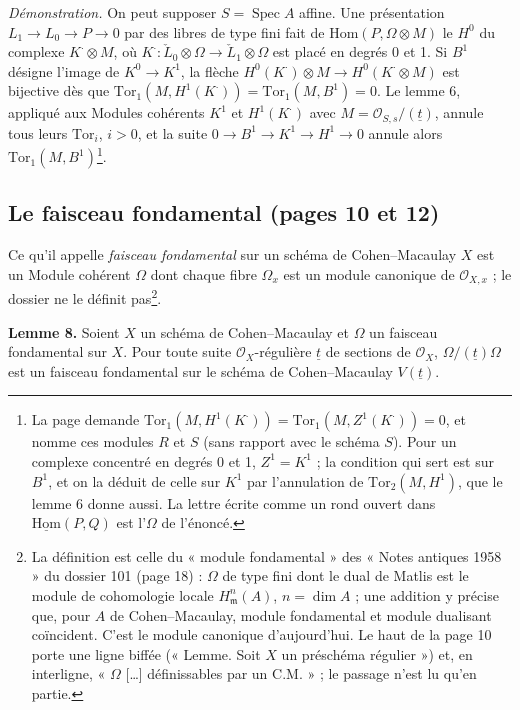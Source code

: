 \documentclass[11pt,a4paper]{article}
\begin{document}
\emph{Démonstration.} On peut supposer $S = \operatorname{Spec} A$ affine. Une
présentation $L_1 \to L_0 \to P \to 0$ par des libres de type fini fait de
$\mathrm{Hom}(P, \Omega \otimes M)$ le $H^0$ du complexe
$K^{\cdot} \otimes M$, où $K^{\cdot} \colon \check{L}_0 \otimes \Omega \to
\check{L}_1 \otimes \Omega$ est placé en degrés 0 et 1. Si $B^1$ désigne
l'image de $K^0 \to K^1$, la flèche $H^0(K^{\cdot}) \otimes M \to
H^0(K^{\cdot} \otimes M)$ est bijective dès que
$\mathrm{Tor}_1(M, H^1(K^{\cdot})) = \mathrm{Tor}_1(M, B^1) = 0$. Le lemme 6,
appliqué aux Modules cohérents $K^1$ et $H^1(K^{\cdot})$ avec
$M = \mathcal{O}_{S,s}/(\underline{t})$, annule tous leurs $\mathrm{Tor}_i$,
$i > 0$, et la suite $0 \to B^1 \to K^1 \to H^1 \to 0$ annule alors
$\mathrm{Tor}_1(M, B^1)$\footnote{La page demande $\mathrm{Tor}_1(M,
H^1(K^{\cdot})) = \mathrm{Tor}_1(M, Z^1(K^{\cdot})) = 0$, et nomme ces modules
$R$ et $S$ (sans rapport avec le schéma $S$). Pour un complexe concentré en
degrés 0 et 1, $Z^1 = K^1$ ; la condition qui sert est sur $B^1$, et on la
déduit de celle sur $K^1$ par l'annulation de $\mathrm{Tor}_2(M, H^1)$, que le
lemme 6 donne aussi. La lettre écrite comme un rond ouvert dans
$\underline{\mathrm{Hom}}(P, Q)$ est l'$\Omega$ de l'énoncé.}.

\subsection*{Le faisceau fondamental (pages 10 et 12)}

Ce qu'il appelle \emph{faisceau fondamental} sur un schéma de Cohen--Macaulay
$X$ est un Module cohérent $\Omega$ dont chaque fibre $\Omega_x$ est un module
canonique de $\mathcal{O}_{X,x}$ ; le dossier ne le définit pas\footnote{La
définition est celle du « module fondamental » des « Notes antiques 1958 » du
dossier 101 (page 18) : $\Omega$ de type fini dont le dual de Matlis est le
module de cohomologie locale $H^n_{\mathfrak{m}}(A)$, $n = \dim A$ ; une
addition y précise que, pour $A$ de Cohen--Macaulay, module fondamental et
module dualisant coïncident. C'est le module canonique d'aujourd'hui. Le haut
de la page 10 porte une ligne biffée (« Lemme. Soit $X$ un préschéma
régulier ») et, en interligne, « $\Omega$ [\ldots] définissables par un
C.M. » ; le passage n'est lu qu'en partie.}.

\textbf{Lemme 8.} Soient $X$ un schéma de Cohen--Macaulay et $\Omega$ un
faisceau fondamental sur $X$. Pour toute suite $\mathcal{O}_X$-régulière
$\underline{t}$ de sections de $\mathcal{O}_X$, $\Omega/(\underline{t})\Omega$
est un faisceau fondamental sur le schéma de Cohen--Macaulay
$V(\underline{t})$.
\end{document}
